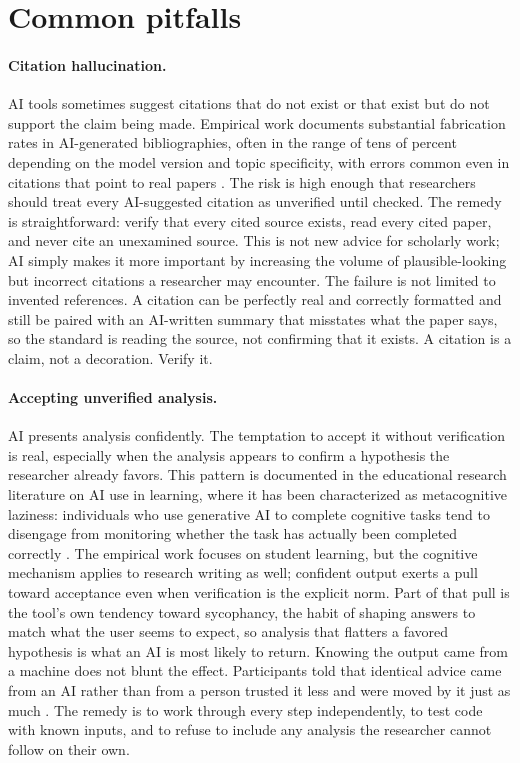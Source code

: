 \documentclass{SIAMbook2023}
\begin{document}
\section{Common pitfalls}

\paragraph{Citation hallucination.}
AI tools sometimes suggest citations that do not exist or that exist but do not support the claim being made. Empirical work documents substantial fabrication rates in AI-generated bibliographies, often in the range of tens of percent depending on the model version and topic specificity, with errors common even in citations that point to real papers \citep{walters2023fabrication}. The risk is high enough that researchers should treat every AI-suggested citation as unverified until checked. The remedy is straightforward: verify that every cited source exists, read every cited paper, and never cite an unexamined source. This is not new advice for scholarly work; AI simply makes it more important by increasing the volume of plausible-looking but incorrect citations a researcher may encounter. The failure is not limited to invented references. A citation can be perfectly real and correctly formatted and still be paired with an AI-written summary that misstates what the paper says, so the standard is reading the source, not confirming that it exists. A citation is a claim, not a decoration. Verify it.

\paragraph{Accepting unverified analysis.}
AI presents analysis confidently. The temptation to accept it without verification is real, especially when the analysis appears to confirm a hypothesis the researcher already favors. This pattern is documented in the educational research literature on AI use in learning, where it has been characterized as metacognitive laziness: individuals who use generative AI to complete cognitive tasks tend to disengage from monitoring whether the task has actually been completed correctly \citep{fan2025beware}. The empirical work focuses on student learning, but the cognitive mechanism applies to research writing as well; confident output exerts a pull toward acceptance even when verification is the explicit norm. Part of that pull is the tool's own tendency toward sycophancy, the habit of shaping answers to match what the user seems to expect, so analysis that flatters a favored hypothesis is what an AI is most likely to return. Knowing the output came from a machine does not blunt the effect. Participants told that identical advice came from an AI rather than from a person trusted it less and were moved by it just as much \citep{cheng2026sycophantic}. The remedy is to work through every step independently, to test code with known inputs, and to refuse to include any analysis the researcher cannot follow on their own.
\end{document}
